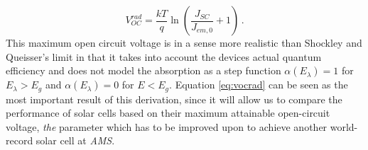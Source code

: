 \begin{equation}
\label{eq:vocrad}
V_{OC}^{rad}=\frac{kT}{q} \ln (\frac{J_{SC}}{J_{em,0}}+1) \, .
\end{equation}
This maximum open circuit voltage is in a sense more realistic than Shockley and Queisser's limit in that it takes into account the devices actual quantum efficiency and does not model the absorption as a step function $\alpha(E_{\lambda})=1$ for $E_{\lambda}>E_g$ and  $\alpha(E_{\lambda})=0$  for $E<E_g$. Equation \eqref{eq:vocrad} can be seen as the most important result of this derivation, since it will allow us to compare the performance of solar cells based on their maximum attainable open-circuit voltage, \emph{the} parameter which has to be improved upon to achieve another world-record solar cell at \emph{AMS}.
